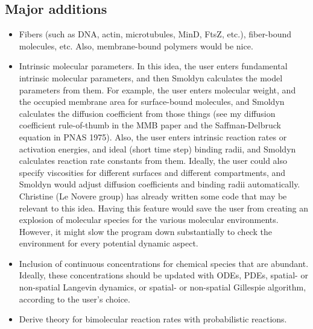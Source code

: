 \documentclass {scrbook}
\begin{document}
\subsection{Major additions}
\begin{itemize}
\item Fibers (such as DNA, actin, microtubules, MinD, FtsZ, etc.), fiber-bound molecules, etc. Also, membrane-bound polymers would be nice.
\item Intrinsic molecular parameters. In this idea, the user enters fundamental intrinsic molecular parameters, and then Smoldyn calculates the model parameters from them. For example, the user enters molecular weight, and the occupied membrane area for surface-bound molecules, and Smoldyn calculates the diffusion coefficient from those things (see my diffusion coefficient rule-of-thumb in the MMB paper and the Saffman-Delbruck equation in PNAS 1975). Also, the user enters intrinsic reaction rates or activation energies, and ideal (short time step) binding radii, and Smoldyn calculates reaction rate constants from them. Ideally, the user could also specify viscosities for different surfaces and different compartments, and Smoldyn would adjust diffusion coefficients and binding radii automatically. Christine (Le Novere group) has already written some code that may be relevant to this idea. Having this feature would save the user from creating an explosion of molecular species for the various molecular environments. However, it might slow the program down substantially to check the environment for every potential dynamic aspect.
\item Inclusion of continuous concentrations for chemical species that are abundant. Ideally, these concentrations should be updated with ODEs, PDEs, spatial- or non-spatial Langevin dynamics, or spatial- or non-spatial Gillespie algorithm, according to the user's choice.
\item Derive theory for bimolecular reaction rates with probabilistic reactions.
\end{itemize}



\end{document}
